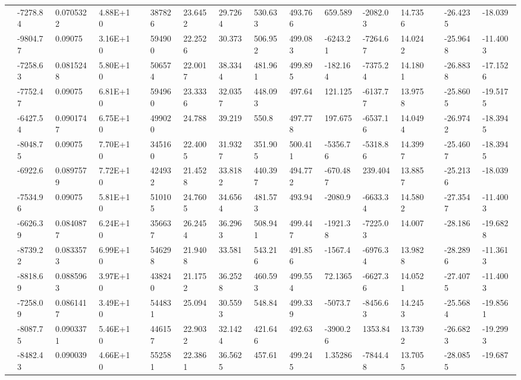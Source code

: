 \documentclass[paper=a4, fontsize=11pt]{scrartcl}
\numberwithin{equation}{section}
\numberwithin{figure}{section}
\numberwithin{table}{section}
\begin{document}
{{\begin{tabular}{l || l | l | l | l | l | l | l | l | l | l | l | l | l | l | l}
    & -7278.84 & 0.0705322 & 4.88E+10 &  & 387826 & 23.6452 & 29.7264 & 530.633 & 493.766 & 659.589 & -2082.03 & 14.7356 &  & -26.4235 & -18.039 \\
    & -9804.77 & 0.09075 & 3.16E+10 &  & 594900 & 22.2526 & 30.373 & 506.952 & 499.083 & -6243.21 & -7264.67 & 14.0242 &  & -25.9648 & -11.4003 \\
    & -7258.63 & 0.0815248 & 5.80E+10 &  & 506574 & 22.0017 & 38.3344 & 481.961 & 499.895 & -182.164 & -7375.24 & 14.1801 &  & -26.8838 & -17.1526 \\
    & -7752.47 & 0.09075 & 6.81E+10 &  & 594960 & 23.3336 & 32.0357 & 448.093 & 497.64 & 121.125 & -6137.77 & 13.9758 &  & -25.8605 & -19.5175 \\
    & -6427.54 & 0.0901747 & 6.75E+10 &  & 499020 & 24.788 & 39.219 & 550.8 & 497.778 & 197.675 & -6537.16 & 14.0494 &  & -26.9742 & -18.3945 \\
    & -8048.75 & 0.09075 & 7.70E+10 &  & 345160 & 22.4005 & 31.9327 & 351.905 & 500.411 & -5356.76 & -5318.86 & 14.3997 &  & -25.4607 & -18.3945 \\
    & -6922.6 & 0.0897579 & 7.72E+10 &  & 424932 & 21.4528 & 33.8182 & 440.397 & 494.772 & -670.487 & 239.404 & 13.8857 &  & -25.2136 & -18.039 \\
    & -7534.96 & 0.09075 & 5.81E+10 &  & 510105 & 24.7605 & 34.6564 & 481.573 & 493.94 & -2080.9 & -6633.34 & 14.5802 &  & -27.3547 & -11.4003 \\
    & -6626.39 & 0.0840877 & 6.24E+10 &  & 356637 & 26.2454 & 36.2963 & 508.941 & 499.447 & -1921.38 & -7225.03 & 14.007 &  & -28.186 & -19.6828 \\
    & -8739.22 & 0.0833573 & 6.99E+10 &  & 546298 & 21.9408 & 33.581 & 543.216 & 491.856 & -1567.4 & -6976.34 & 13.9828 &  & -28.2896 & -11.3613 \\
    & -8818.69 & 0.0885963 & 3.97E+10 &  & 438240 & 21.1752 & 36.2528 & 460.593 & 499.554 & 72.1365 & -6627.36 & 14.0521 &  & -27.4075 & -11.4003 \\
    & -7258.09 & 0.0861417 & 3.49E+10 &  & 544831 & 25.094 & 30.5593 & 548.84 & 499.339 & -5073.7 & -8456.63 & 14.2453 &  & -25.5684 & -19.8561 \\
    & -8087.75 & 0.0903371 & 5.46E+10 &  & 446157 & 22.9032 & 32.1424 & 421.646 & 492.63 & -3900.26 & 1353.84 & 13.7392 &  & -26.6823 & -19.2993 \\
    & -8482.43 & 0.090039 & 4.66E+10 &  & 552581 & 22.3861 & 36.5625 & 457.61 & 499.245 & 1.35286 & -7844.48 & 13.7055 &  & -28.0855 & -19.687 \\

\end{tabular}}}
\end{document}
